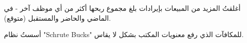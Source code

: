 \begin{achievements}
	\item أغلقتُ المزيد من المبيعات بإيرادات بلغ مجموع ربحها أكثر من أي موظف آخر - في الماضي والحاضر والمستقبل (متوقع).
	\item أسستُ نظام \foreignlanguage{english}{"Schrute Bucks"} للمكافآت الذي رفع معنويات المكتب بشكل لا يقاس.
\end{achievements}
